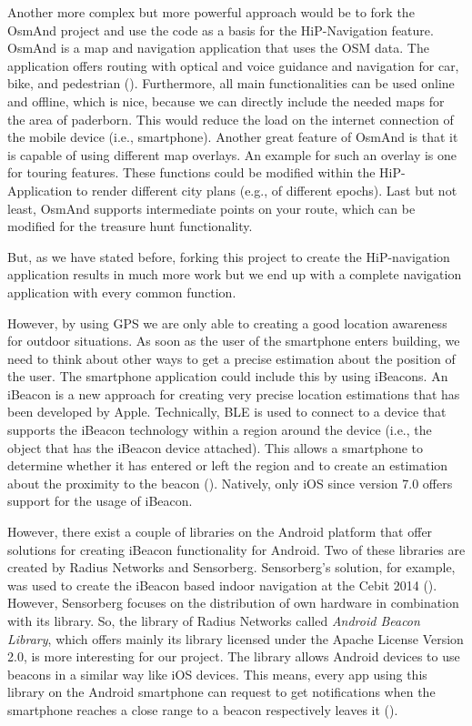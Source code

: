 Another more complex but more powerful approach would be to fork the \ac{OsmAnd} project and use the code as a basis for the HiP-Navigation feature. \ac{OsmAnd} is a map and navigation application that uses the \ac{OSM} data. The application offers routing with optical and voice guidance and navigation for car, bike, and pedestrian (\cite{osmand}). Furthermore, all main functionalities can be used online and offline, which is nice, because we can directly include the needed maps for the area of paderborn. This would reduce the load on the internet connection of the mobile device (i.e., smartphone). Another great feature of \ac{OsmAnd} is that it is capable of using different map overlays. An example for such an overlay is one for touring features. These functions could be modified within the HiP-Application to render different city plans (e.g., of different epochs). Last but not least, \ac{OsmAnd} supports intermediate points on your route, which can be modified for the treasure hunt functionality.

But, as we have stated before, forking this project to create the \ac{HiP}-navigation application results in much more work but we end up with a complete navigation application with every common function. 

However, by using \ac{GPS} we are only able to creating a good location awareness for outdoor situations. As soon as the user of the smartphone enters building, we need to think about other ways to get a precise estimation about the position of the user. The smartphone application could include this by using iBeacons. 
An iBeacon is a new approach for creating very precise location estimations that has been developed by Apple. Technically, \ac{BLE} is used to connect to a device that supports the iBeacon technology within a region around the device (i.e., the object that has the iBeacon device attached). This allows a smartphone to determine whether it has entered or left the region and to create an estimation about the proximity to the beacon (\cite{Apple:2014aa}). Natively, only iOS since version 7.0 offers support for the usage of iBeacon.

However, there exist a couple of libraries on the Android platform that offer solutions for creating iBeacon functionality for Android. Two of these libraries are created by Radius Networks and Sensorberg. Sensorberg's solution, for example, was used to create the iBeacon based indoor navigation at the Cebit 2014 (\cite{Kaufmann:2014aa}). However, Sensorberg focuses on the distribution of own hardware in combination with its library. So, the library of Radius Networks called \emph{Android Beacon Library}, which offers mainly its library licensed under the Apache License Version 2.0, is more interesting for our project. The library allows Android devices to use beacons in a similar way like iOS devices. This means, every app using this library on the Android smartphone can request to get notifications when the smartphone reaches a close range to a beacon respectively leaves it (\cite{RadiusNetworks:2015aa}). 

